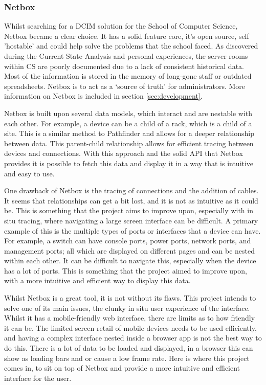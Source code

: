\documentclass [11pt,a4paper]{article}
\begin{document}
\pagebreak

\subsubsection{Netbox}
\label{sec:netbox}

Whilst searching for a DCIM solution for the School of Computer Science, Netbox became a clear choice. It has a solid feature core, it's open source, self 'hostable' and could help solve the problems that the school faced. As discovered during the Current State Analysis and personal experiences, the server rooms within CS are poorly documented due to a lack of consistent historical data. Most of the information is stored in the memory of long-gone staff or outdated spreadsheets. Netbox is to act as a `source of truth'\cite{Netbox} for administrators. More information on Netbox is included in section \ref{sec:development}. 

Netbox is built upon several data models, which interact and are nestable with each other. For example, a device can be a child of a rack, which is a child of a site. This is a similar method to Pathfinder and allows for a deeper relationship between data. This parent-child relationship allows for efficient tracing between devices and connections. With this approach and the solid API that Netbox provides it is possible to fetch this data and display it in a way that is intuitive and easy to use. 

One drawback of Netbox is the tracing of connections and the addition of cables. It seems that relationships can get a bit lost, and it is not as intuitive as it could be. This is something that the project aims to improve upon, especially with in situ tracing, where navigating a large screen interface can be difficult. A primary example of this is the multiple types of ports or interfaces that a device can have. For example, a switch can have console ports, power ports, network ports, and management ports; all which are displayed on different pages and can be nested within each other. It can be difficult to navigate this, especially when the device has a lot of ports. This is something that the project aimed to improve upon, with a more intuitive and efficient way to display this data.

Whilst Netbox is a great tool, it is not without its flaws. This project intends to solve one of its main issues, the clunky in situ user experience of the interface. Whilst it has a mobile-friendly web interface, there are limits as to how friendly it can be. The limited screen retail of mobile devices needs to be used efficiently, and having a complex interface nested inside a browser app is not the best way to do this. There is a lot of data to be loaded and displayed, in a browser this can show as loading bars and or cause a low frame rate. Here is where this project comes in, to sit on top of Netbox and provide a more intuitive and efficient interface for the user.  
\end{document}
